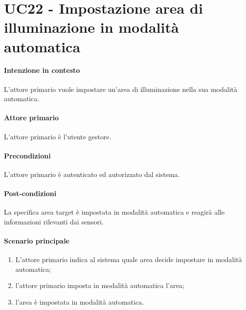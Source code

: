 \section{UC22 - Impostazione area di illuminazione in modalità automatica}\label{uc:22}
\paragraph{Intenzione in contesto} L'attore primario vuole impostare un'area di illuminazione nella sua modalità automatica.
\paragraph{Attore primario} L'attore primario è l'utente gestore.
\paragraph{Precondizioni}  L'attore primario è autenticato ed autorizzato dal sistema.
\paragraph{Post-condizioni} La specifica area target è impostata in modalità automatica e reagirà alle informazioni rilevanti dai sensori.
\paragraph{Scenario principale}
\begin{enumerate}
    \item L'attore primario indica al sistema quale area decide impostare in modalità automatica;
    \item l'attore primario imposta in modalità automatica l'area;
    \item l'area è impostata in modalità automatica.
\end{enumerate}